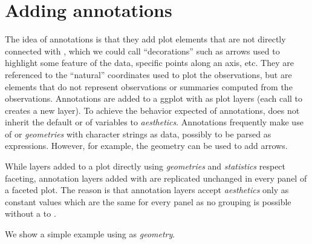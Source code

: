 \documentclass[krantz2]{krantz}\usepackage{knitr}
\begin{document}
\section{Adding annotations}\label{sec:plot:annotations}
The idea of annotations is that they add plot elements that are not directly connected with , which we could call ``decorations'' such as arrows used to highlight some feature of the data, specific points along an axis, etc. They are referenced to the ``natural'' coordinates used to plot the observations, but are elements that do not represent observations or summaries computed from the observations.  Annotations are added to a ggplot with  as plot layers (each call to  creates a new layer). To achieve the behavior expected of annotations,  does not inherit the default  or  of variables to \emph{aesthetics}. Annotations frequently make use of  or  \emph{geometries} with character strings as data, possibly to be parsed as expressions. However, for example, the  geometry can be used to add arrows.

\begin{warningbox}
While layers added to a plot directly using \emph{geometries} and \emph{statistics} respect faceting, annotation layers added with  are replicated unchanged in every panel of a faceted plot. The reason is that annotation layers accept \emph{aesthetics} only as constant values which are the same for every panel as no grouping is possible without a  to .
\end{warningbox}

We show a simple example using  as \emph{geometry}.
\end{document}
